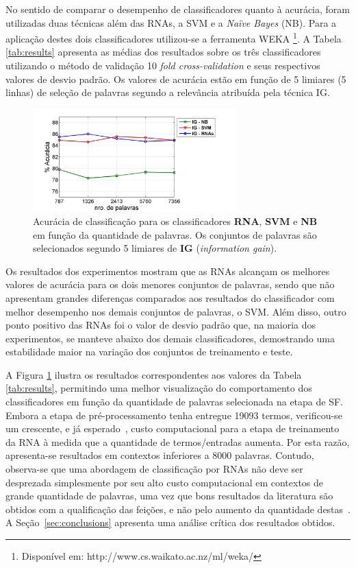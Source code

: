\documentclass[11pt,a4paper]{article}
\begin{document}
No sentido de comparar o desempenho de classificadores quanto à acurácia, foram utilizadas duas técnicas além das RNAs, a SVM e a \textit{Naïve Bayes} (NB). Para a aplicação destes dois classificadores utilizou-se a ferramenta WEKA \footnote{Disponível em: http://www.cs.waikato.ac.nz/ml/weka/}. A Tabela \ref{tab:results} apresenta as médias dos resultados sobre os três classificadores utilizando o método de validação 10 \textit{fold cross-validation} e seus respectivos valores de desvio padrão. Os valores de acurácia estão em função de 5 limiares (5 linhas) de seleção de palavras segundo a relevância atribuída pela técnica IG.

\begin{figure}[h]
\begin{center}
\includegraphics[width=0.70\textwidth]{filmes.jpg}
\caption{Acurácia de classificação para os classificadores \textbf{\textsf{RNA}}, \textbf{\textsf{SVM}} e \textbf{\textsf{NB}} em função da quantidade de palavras. Os conjuntos de palavras são selecionados segundo 5 limiares de \textbf{\textsf{IG}} (\textit{information gain}).\label{fig:results}}
\end{center}
\end{figure}

Os resultados dos experimentos mostram que as RNAs alcançam os melhores valores de acurácia para os dois menores conjuntos de palavras, sendo que não apresentam grandes diferenças comparados aos resultados do classificador com melhor desempenho nos demais conjuntos de palavras, o SVM. Além disso, outro ponto positivo das RNAs foi o valor de desvio padrão que, na maioria dos experimentos, se manteve abaixo dos demais classificadores, demostrando uma estabilidade maior na variação dos conjuntos de treinamento e teste.

A Figura \ref{fig:results} ilustra os resultados correspondentes aos valores da Tabela \ref{tab:results}, permitindo uma melhor visualização do comportamento dos classificadores em função da quantidade de palavras selecionada na etapa de SF. Embora a etapa de pré-processamento tenha entregue 19093 termos, verificou-se um crescente, e já esperado~\cite{haykin:RNA}, custo computacional para a etapa de treinamento da RNA à medida que a quantidade de termos/entradas aumenta. Por esta razão, apresenta-se resultados em contextos inferiores a 8000 palavras. Contudo, observa-se que uma abordagem de classificação por RNAs não deve ser desprezada simplesmente por seu alto custo computacional em contextos de grande quantidade de palavras, uma vez que bons resultados da literatura são obtidos com a qualificação das feições, e não pelo aumento da quantidade destas~\cite{Whitelaw:Appraisal,Zaidan:Rationales,Pang04:Subjectivity,Li:Framework}. A Seção~\ref{sec:conclusions} apresenta uma análise crítica dos resultados obtidos.
\end{document}
